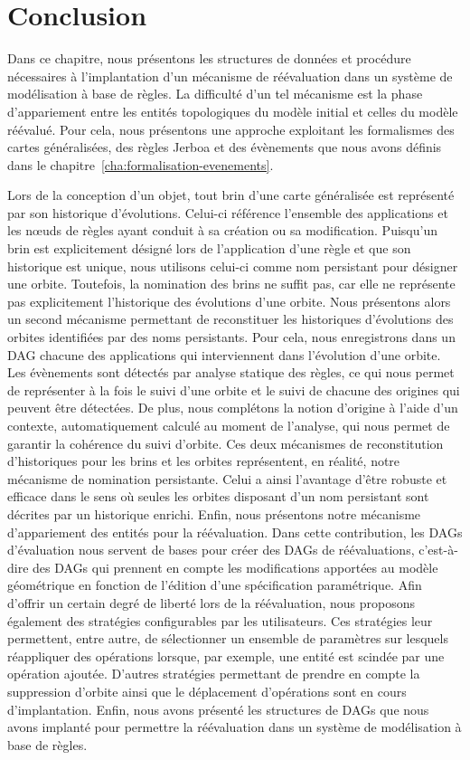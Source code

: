 \section{Conclusion}
\label{sec:reevaluation-base-regles-conclusion}

Dans ce chapitre, nous présentons les structures de données et procédure
nécessaires à l'implantation d'un mécanisme de réévaluation dans un système de
modélisation à base de règles. %
La difficulté d'un tel mécanisme est la phase d'appariement entre les entités
topologiques du modèle initial et celles du modèle réévalué. %
Pour cela, nous présentons une approche exploitant les formalismes des cartes
généralisées, des règles Jerboa et des évènements que nous avons définis dans le
chapitre~\ref{cha:formalisation-evenements}. %

Lors de la conception d'un objet, tout brin d'une carte généralisée est
représenté par son historique d'évolutions. %
Celui-ci référence l'ensemble des applications et les n\oe uds de règles ayant
conduit à sa création ou sa modification. %
Puisqu'un brin est explicitement désigné lors de l'application d'une règle et
que son historique est unique, nous utilisons celui-ci comme nom persistant pour
désigner une orbite. %
Toutefois, la nomination des brins ne suffit pas, car elle ne représente pas
explicitement l'historique des évolutions d'une orbite. %
Nous présentons alors un second mécanisme permettant de reconstituer les
historiques d'évolutions des orbites identifiées par des noms persistants. %
Pour cela, nous enregistrons dans un DAG chacune des applications qui
interviennent dans l'évolution d'une orbite. %
Les évènements sont détectés par analyse statique des règles, ce qui nous permet
de représenter à la fois le suivi d'une orbite et le suivi de chacune des
origines qui peuvent être détectées. %
De plus, nous complétons la notion d'origine à l'aide d'un contexte,
automatiquement calculé au moment de l'analyse, qui nous permet de garantir la
cohérence du suivi d'orbite. %
Ces deux mécanismes de reconstitution d'historiques pour les brins et les
orbites représentent, en réalité, notre mécanisme de nomination persistante. %
Celui a ainsi l'avantage d'être robuste et efficace dans le sens où seules les
orbites disposant d'un nom persistant sont décrites par un historique enrichi. %
Enfin, nous présentons notre mécanisme d'appariement des entités pour la
réévaluation. %
Dans cette contribution, les DAGs d'évaluation nous servent de bases pour créer
des DAGs de réévaluations, c'est-à-dire des DAGs qui prennent en compte les
modifications apportées au modèle géométrique en fonction de l'édition d'une
spécification paramétrique. %
Afin d'offrir un certain degré de liberté lors de la réévaluation, nous
proposons également des stratégies configurables par les utilisateurs. %
Ces stratégies leur permettent, entre autre, de sélectionner un ensemble de
paramètres sur lesquels réappliquer des opérations lorsque, par exemple, une
entité est scindée par une opération ajoutée. %
D'autres stratégies permettant de prendre en compte la suppression d'orbite
ainsi que le déplacement d'opérations sont en cours d'implantation. %
Enfin, nous avons présenté les structures de DAGs que nous avons implanté pour
permettre la réévaluation dans un système de modélisation à base de règles. %

